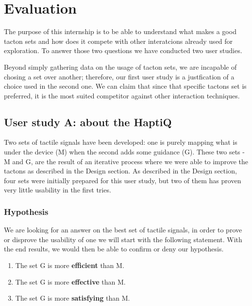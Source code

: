 \chapter{Evaluation}

The purpose of this internship is to be able to understand what makes a
good tacton sets and how does it compete with other interatcions already
used for exploration. To answer those two questions we have conducted
two user studies.

Beyond simply gathering data on the usage of tacton sets, we are
incapable of chosing a set over another; therefore, our first user study
is a justfication of a choice used in the second one. We can claim that
since that specific tactons set is preferred, it is the most suited
competitor against other interaction techniques.

\section{User study A: about the
HaptiQ}\label{user-study-a-about-the-haptiq}

Two sets of tactile signals have been developed: one is purely mapping
what is under the device (M) when the second adds some guidance (G).
These two sets - M and G, are the result of an iterative process where
we were able to improve the tactons as described in the Design section.
As described in the Design section, four sets were initially prepared
for this user study, but two of them has proven very little usability in
the first tries.

\subsection{Hypothesis}\label{hypothesis}

We are looking for an answer on the best set of tactile signals, in
order to prove or disprove the usability of one we will start with the
following statement. With the end results, we would then be able to
confirm or deny our hypothesis.

\begin{enumerate}
\def\labelenumi{\arabic{enumi}.}
\item
  The set G is more \textbf{efficient} than M.
\item
  The set G is more \textbf{effective} than M.
\item
  The set G is more \textbf{satisfying} than M.
\end{enumerate}

